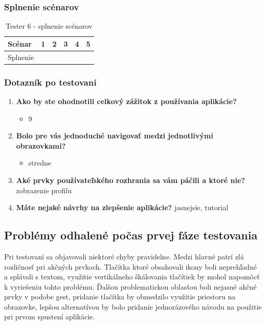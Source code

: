 \subsubsection*{Splnenie scénarov}
\begin{table}[h!]
    \centering
    \begin{tabular}{|l|p{1.5cm}|p{1.5cm}|p{1.5cm}|p{1.5cm}|p{1.5cm}|}
        \hline
        Scénar & 1 & 2 & 3 & 4 & 5 \\ \hline
        Splnenie & & & & & \\ \hline
    \end{tabular}
    \caption{Tester 6 - splnenie scénarov}
\end{table}

\subsubsection*{Dotazník po testovaní}
\begin{enumerate}[leftmargin=*]
    \item \textbf{Ako by ste ohodnotili celkový zážitok z používania aplikácie?}
    \begin{itemize}
        \item 9
    \end{itemize}
    \item \textbf{Bolo pre vás jednoduché navigovať medzi jednotlivými obrazovkami?}
    \begin{itemize}
        \item stredne
    \end{itemize}
    \item \textbf{Aké prvky používateľského rozhrania sa vám páčili a ktoré nie?} zobrazenie profilu
    \item \textbf{Máte nejaké návrhy na zlepšenie aplikácie?} jasnejsie, tutorial
\end{enumerate}

\subsection{Problémy odhalené počas prvej fáze testovania}
Pri testovaní sa objavovali niektoré chyby pravidelne. Medzi hlavné patrí zlá rozličnosť pri akčných prvkoch. Tlačítka ktoré obsahovali ikony boli neprehľadné a splávali s textom, využitie vertikálneho škálovania tlačítiek by mohol napomôcť k vyriešeniu tohto problému. Ďalšou problematickou oblasťou boli nejasné akčné prvky v podobe gest, pridanie tlačítka by obmedzilo využitie priestoru na obrazovke, lepšou alternatívou by bolo pridanie jednorázového návodu na použitie pri prvom spustení aplikácie.


